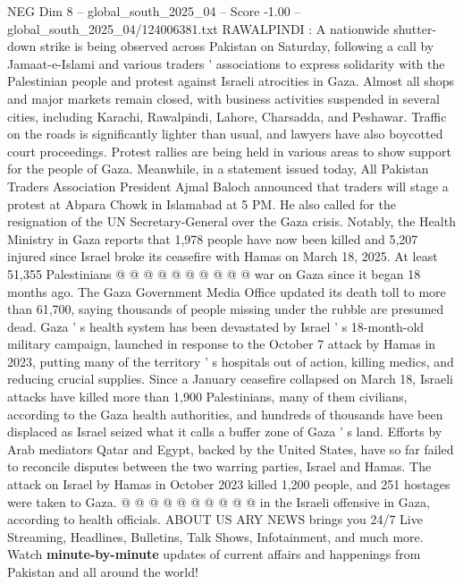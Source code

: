 \begin{textsample}{NEG Dim 8 – global\_south\_2025\_04 – Score -1.00 – global\_south\_2025\_04/124006381.txt}  \label{ex:f8_neg_279}
RAWALPINDI : A nationwide shutter-down strike is being observed across Pakistan on Saturday, following a call by Jamaat-e-Islami and various traders ' associations to express solidarity with the Palestinian people and protest against Israeli atrocities in Gaza.
Almost all shops and major markets remain closed, with business activities suspended in several cities, including Karachi, Rawalpindi, Lahore, Charsadda, and Peshawar.
Traffic on the roads is significantly lighter than usual, and lawyers have also boycotted court proceedings.
Protest rallies are being held in various areas to show support for the people of Gaza.
Meanwhile, in a statement issued today, All Pakistan Traders Association President Ajmal Baloch announced that traders will stage a protest at Abpara Chowk in Islamabad at 5 PM.
He also called for the resignation of the UN Secretary-General over the Gaza crisis.
Notably, the Health Ministry in Gaza reports that 1,978 people have now been killed and 5,207 injured since Israel broke its ceasefire with Hamas on March 18, 2025.
At least 51,355 Palestinians @ @ @ @ @ @ @ @ @ @ war on Gaza since it began 18 months ago.
The Gaza Government Media Office updated its death toll to more than 61,700, saying thousands of people missing under the rubble are presumed dead.
Gaza ' s health system has been devastated by Israel ' s 18-month-old military campaign, launched in response to the October 7 attack by Hamas in 2023, putting many of the territory ' s hospitals out of action, killing medics, and reducing crucial supplies.
Since a January ceasefire collapsed on March 18, Israeli attacks have killed more than 1,900 Palestinians, many of them civilians, according to the Gaza health authorities, and hundreds of thousands have been displaced as Israel seized what it calls a buffer zone of Gaza ' s land.
Efforts by Arab mediators Qatar and Egypt, backed by the United States, have so far failed to reconcile disputes between the two warring parties, Israel and Hamas.
The attack on Israel by Hamas in October 2023 killed 1,200 people, and 251 hostages were taken to Gaza. @ @ @ @ @ @ @ @ @ @ in the Israeli offensive in Gaza, according to health officials.
ABOUT US ARY NEWS brings you 24/7 Live Streaming, Headlines, Bulletins, Talk Shows, Infotainment, and much more.
Watch \textbf{minute-by-minute} updates of current affairs and happenings from Pakistan and all around the world!

\end{textsample}
